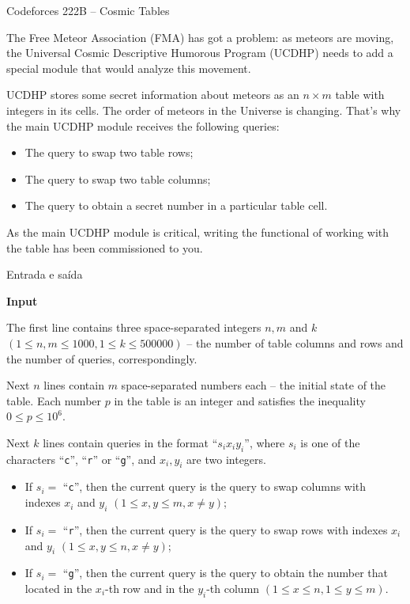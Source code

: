 \begin{frame}[fragile]{Codeforces 222B -- Cosmic Tables}

The Free Meteor Association (FMA) has got a problem: as meteors are moving, the Universal Cosmic Descriptive Humorous Program (UCDHP) needs to add a special module that would analyze this movement.

UCDHP stores some secret information about meteors as an $n \times m$ table with integers in its cells. The order of meteors in the Universe is changing. That's why the main UCDHP module receives the following queries:

\begin{itemize}
    \item The query to swap two table rows;
    \item The query to swap two table columns;
    \item The query to obtain a secret number in a particular table cell.
\end{itemize}

As the main UCDHP module is critical, writing the functional of working with the table has been commissioned to you.

\end{frame}

\begin{frame}[fragile]{Entrada e saída}

\textbf{Input}

The first line contains three space-separated integers $n, m$ and $k$ $(1 \leq n, m \leq 1000, 1 \leq k \leq 500000)$ -- the number of table columns and rows and the number of queries, correspondingly.

Next $n$ lines contain $m$ space-separated numbers each -- the initial state of the table. Each number $p$ in the table is an integer and satisfies the inequality $0 \leq p \leq 10^6$.

Next $k$ lines contain queries in the format ``$s_i x_i y_i$'', where $s_i$ is one of the characters ``\texttt{с}'', ``\texttt{r}'' or ``\texttt{g}'', and $x_i, y_i$ are two integers.

\begin{itemize}
    \item If $s_i =$ ``\texttt{c}'', then the current query is the query to swap columns with indexes $x_i$ and $y_i$ $(1 \leq x, y \leq m, x \neq y)$;
    \item If $s_i =$ ``\texttt{r}'', then the current query is the query to swap rows with indexes $x_i$ and $y_i$ $(1 \leq x, y \leq n, x \neq y)$;
    \item If $s_i =$ ``\texttt{g}'', then the current query is the query to obtain the number that located in the $x_i$-th row and in the $y_i$-th column $(1 \leq x \leq n, 1 \leq y \leq m)$.
\end{itemize}

\end{frame}

